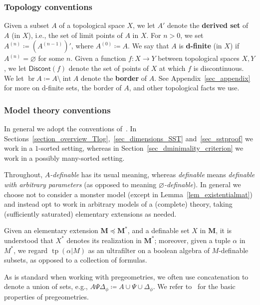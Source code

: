 \documentclass[11pt]{amsart}
\theoremstyle{plain}
\theoremstyle{definition}
\numberwithin{equation}{section}
\newcommand\0{\varnothing}
\begin{document}
\subsubsection*{Topology conventions} Given a subset $A$ of a topological space $X$, we let $A'$ denote the \textbf{derived set} of $A$ (in $X$), i.e., the set of limit points of $A$ in $X$.
For $n>0$, we set $A^{(n)} \coloneqq (A^{(n-1)})'$, where $A^{(0)} \coloneqq A$. We say that $A$ is \textbf{d-finite} (in $X$) if $A^{(n)}=\varnothing$ for some $n$. 
Given a function $f\colon X\to Y$ between topological spaces $X,Y$, we let $\mathsf{Discont}(f)$ denote the set of points of $X$ at which $f$ is discontinuous.
We let $\operatorname{br}A \coloneqq A \setminus \operatorname{int}A$ denote the \textbf{border} of $A$.  
See Appendix~\ref{sec_appendix} for more on d-finite sets, the border of $A$, and other topological facts we use. 

\subsubsection*{Model theory conventions} 
In general we adopt the conventions of~\cite[Appendix B]{ADAMTT}. In Sections~\ref{section_overview_Tlog},~\ref{sec_dimensions_SST} and~\ref{sec_sstproof} we work in a $1$-sorted setting, whereas in Section~\ref{sec_dminimality_criterion} we work in a possibly many-sorted setting.

\medskip\noindent
Throughout, \emph{$A$-definable} has its usual meaning, whereas \emph{definable} means \emph{definable with arbitrary parameters} (as opposed to meaning \emph{$\varnothing$-definable}). 
In general we choose not to consider a monster model (except in Lemma~\ref{lem_existentialmat}) and instead opt to work in arbitrary models of a (complete) theory, taking (sufficiently saturated) elementary extensions as needed. 

\medskip\noindent
Given an elementary extension $\bm{M}\preccurlyeq\bm{M}^*$, and a definable set $X$ in $\bm{M}$, it is understood that $X^*$ denotes its realization in $\bm{M}^*$; moreover, given a tuple $\alpha$ in $M^*$, we regard $\operatorname{tp}(\alpha|M)$ as an ultrafilter on a boolean algebra of $M$-definable subsets, as opposed to a collection of formulas. 

\medskip\noindent
As is standard when working with pregeometries, we often use concatenation to denote a union of sets, e.g., $A\Psi\Delta_{\phi}\coloneqq A\cup\Psi\cup\Delta_{\phi}$. We refer to~\cite[C.1]{tent2012course} for the basic properties of pregeometries.
\end{document}
